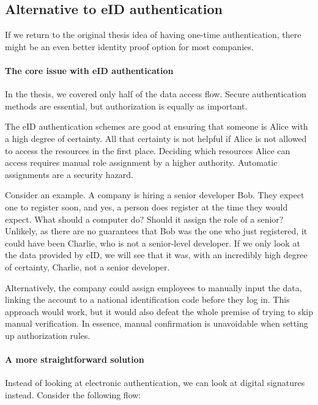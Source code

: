 \subsection{Alternative to eID authentication}

If we return to the original thesis idea of having one-time authentication, there might be an even better identity proof option for most companies.

\paragraph{The core issue with eID authentication}

In the thesis, we covered only half of the data access flow. Secure authentication methods are essential, but authorization is equally as important.

The eID authentication schemes are good at ensuring that someone is Alice with a high degree of certainty. All that certainty is not helpful if Alice is not allowed to access the resources in the first place. Deciding which resources Alice can access requires manual role assignment by a higher authority. Automatic assignments are a security hazard.

Consider an example. A company is hiring a senior developer Bob. They expect one to register soon, and yes, a person does register at the time they would expect. What should a computer do? Should it assign the role of a senior? Unlikely, as there are no guarantees that Bob was the one who just registered, it could have been Charlie, who is not a senior-level developer. If we only look at the data provided by eID, we will see that it was, with an incredibly high degree of certainty, Charlie, not a senior developer.

Alternatively, the company could assign employees to manually input the data, linking the account to a national identification code before they log in. This approach would work, but it would also defeat the whole premise of trying to skip manual verification. In essence, manual confirmation is unavoidable when setting up authorization rules.

\paragraph{A more straightforward solution}

Instead of looking at electronic authentication, we can look at digital signatures instead. Consider the following flow:

